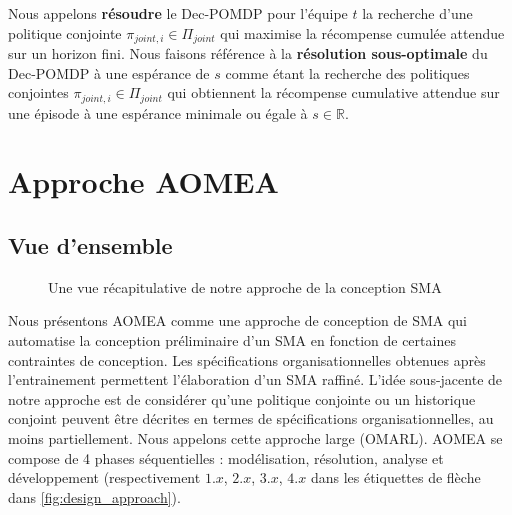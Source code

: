 \documentclass[contribution]{jfsma}
\begin{document}
Nous appelons \textbf{résoudre} le Dec-POMDP pour l'équipe $t$ la recherche d'une politique conjointe $\pi_{joint,i} \in \Pi_{joint}$ qui maximise la récompense cumulée attendue sur un horizon fini.
Nous faisons référence à la \textbf{résolution sous-optimale} du Dec-POMDP à une espérance de $s$ comme étant la recherche des politiques conjointes $\pi_{joint,i} \in \Pi_{joint}$ qui obtiennent la récompense cumulative attendue sur une épisode à une espérance minimale ou égale à $s \in \mathbb{R}$.



\section{Approche AOMEA}



\subsection{Vue d'ensemble}

\begin{figure}[h!]
  \centering
  
  \caption{Une vue récapitulative de notre approche de la conception SMA}
  \label{fig:design_approach}
\end{figure}

Nous présentons AOMEA comme une approche de conception de SMA qui automatise la conception préliminaire d'un SMA en fonction de certaines contraintes de conception. Les spécifications organisationnelles obtenues après l'entrainement permettent l’élaboration d’un SMA raffiné.
L’idée sous-jacente de notre approche est de considérer qu’une politique conjointe ou un historique conjoint peuvent être décrites en termes de spécifications organisationnelles, au moins partiellement.
Nous appelons cette approche large  (OMARL).
%
%
AOMEA se compose de 4 phases séquentielles : modélisation, résolution, analyse et développement (respectivement $1.x$, $2.x$, $3.x$, $4.x$ dans les étiquettes de flèche dans \autoref{fig:design_approach}).
\end{document}
